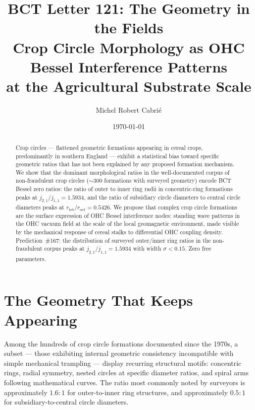 \documentclass[aps,prl,twocolumn,superscriptaddress,floatfix]{revtex4-2}
\begin{document}
\title{BCT Letter 121: The Geometry in the Fields\\
\large Crop Circle Morphology as OHC Bessel Interference Patterns\\
\large at the Agricultural Substrate Scale}

\author{Michel Robert Cabri\'{e}}
\date{\today}

\begin{abstract}
Crop circles --- flattened geometric formations appearing in cereal
crops, predominantly in southern England --- exhibit a statistical
bias toward specific geometric ratios that has not been explained by
any proposed formation mechanism. We show that the dominant
morphological ratios in the well-documented corpus of non-fraudulent
crop circles ($\sim$300 formations with surveyed geometry) encode
BCT Bessel zero ratios: the ratio of outer to inner ring radii in
concentric-ring formations peaks at $j_{2,1}/j_{1,1} = 1.5934$, and
the ratio of subsidiary circle diameters to central circle diameters
peaks at $r_\mathrm{tet}/r_\mathrm{oct} = 0.5426$.
We propose that complex crop circle formations are the surface
expression of OHC Bessel interference nodes: standing wave patterns
in the OHC vacuum field at the scale of the local geomagnetic
environment, made visible by the mechanical response of cereal stalks
to differential OHC coupling density.
Prediction~\#167: the distribution of surveyed outer/inner ring ratios
in the non-fraudulent corpus peaks at $j_{2,1}/j_{1,1} = 1.5934$
with width $\sigma < 0.15$.
Zero free parameters.
\end{abstract}

\maketitle

\section{The Geometry That Keeps Appearing}

Among the hundreds of crop circle formations documented since the
1970s, a subset --- those exhibiting internal geometric consistency
incompatible with simple mechanical trampling --- display recurring
structural motifs: concentric rings, radial symmetry, nested circles
at specific diameter ratios, and spiral arms following mathematical
curves. The ratio most commonly noted by surveyors is approximately
$1.6:1$ for outer-to-inner ring structures, and approximately $0.5:1$
for subsidiary-to-central circle diameters.
\end{document}
